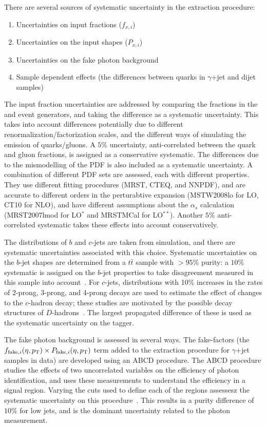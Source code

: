 There are several sources of systematic uncertainty in the extraction procedure:

\begin{enumerate}
\item Uncertainties on input fractions ($f_{x,i}$)
\item Uncertainties on the input shapes ($P_{x,i}$) 
\item Uncertainties on the fake photon background
\item Sample dependent effects (the differences between quarks in $\gamma$+jet and dijet samples)
\end{enumerate}

The input fraction uncertainties are addressed by comparing the fractions in the \Pythia and \Madgraph event generators, and taking the difference as a systematic uncertainty. This takes into account differences potentially due to different renormalization/factorization scales, and the different ways of simulating the emission of quarks/gluons. A $5\%$ uncertainty, anti-correlated between the quark and gluon fractions, is assigned as a conservative systematic. The differences due to the mismodelling of the PDF is also included as a systematic uncertainty. A combination of different PDF sets are assessed, each with different properties. They use different fitting procedures (MRST, CTEQ, and NNPDF), and are accurate to different orders in the perturabtive expansion (MSTW2008lo for LO, CT10 for NLO), and have different assumptions about the $\alpha_s$ calculation (MRST2007lmod for LO$^*$ and MRSTMCal for LO$^{**}$). Another $5\%$ anti-correlated systematic takes these effects into account conservatively.

The distributions of $b$ and $c$-jets are taken from simulation, and there are systematic uncertainties associated with this choice. Systematic uncertainties on the $b$-jet shapes are determined from a $t\bar{t}$ sample with $> 95\%$ purity: a $10\%$ systematic is assigned on the $b$-jet properties to take disagreement measured in this sample into account~\cite{Golling:1554107}. For $c$-jets, distributions with 10\% increases in the rates of 2-prong, 3-prong, and 4-prong decays are used to estimate the effect of changes to the $c$-hadron decay;  these studies are motivated by the possible decay structures of $D$-hadrons~\cite{Golling:1554107}. The largest propagated difference of these is used as the systematic uncertainty on the tagger.

The fake photon background is assessed in several ways. The fake-factors (the $f_{{\rm fake}, i}(\eta,p_{\text{T}})\times P_{{\rm fake}, i}(\eta,p_{\text{T}})$ term added to the extraction procedure for $\gamma$+jet samples in data) are developed using an ABCD procedure. The ABCD procedure studies the effects of two uncorrelated variables on the efficiency of photon identification, and uses these measurements to understand the efficiency in a signal region. Varying the cuts used to define each of the regions assessesz the systematic uncertainty on this procedure~\cite{JES2011}. This results in a purity difference of $10\%$ for low \pt jets, and is the dominant uncertainty related to the photon measurement.

